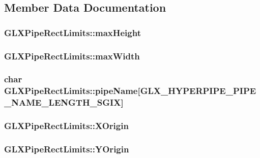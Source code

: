 \subsection{Member Data Documentation}
\hypertarget{struct_g_l_x_pipe_rect_limits_a27572e499c0d3280031c2ad8e387c0c1}{
\subsubsection[{max\-Height}]{ G\-L\-X\-Pipe\-Rect\-Limits\-::max\-Height}}\label{struct_g_l_x_pipe_rect_limits_a27572e499c0d3280031c2ad8e387c0c1}
\hypertarget{struct_g_l_x_pipe_rect_limits_a8662c7a712b30620e25fc994adf337a1}{
\subsubsection[{max\-Width}]{ G\-L\-X\-Pipe\-Rect\-Limits\-::max\-Width}}\label{struct_g_l_x_pipe_rect_limits_a8662c7a712b30620e25fc994adf337a1}
\hypertarget{struct_g_l_x_pipe_rect_limits_ae78b4b6656101bc841946733a5b6e5ce}{
\subsubsection[{pipe\-Name}]{\setlength{\rightskip}{0pt plus 5cm}char G\-L\-X\-Pipe\-Rect\-Limits\-::pipe\-Name\mbox{[}{\bf G\-L\-X\-\_\-\-H\-Y\-P\-E\-R\-P\-I\-P\-E\-\_\-\-P\-I\-P\-E\-\_\-\-N\-A\-M\-E\-\_\-\-L\-E\-N\-G\-T\-H\-\_\-\-S\-G\-I\-X}\mbox{]}}}\label{struct_g_l_x_pipe_rect_limits_ae78b4b6656101bc841946733a5b6e5ce}
\hypertarget{struct_g_l_x_pipe_rect_limits_a3e5a965059d9f5d2ca42acd35af5bb9b}{
\subsubsection[{X\-Origin}]{ G\-L\-X\-Pipe\-Rect\-Limits\-::\-X\-Origin}}\label{struct_g_l_x_pipe_rect_limits_a3e5a965059d9f5d2ca42acd35af5bb9b}
\hypertarget{struct_g_l_x_pipe_rect_limits_a50e06bcf0dae95854be7d93a515199e9}{
\subsubsection[{Y\-Origin}]{ G\-L\-X\-Pipe\-Rect\-Limits\-::\-Y\-Origin}}\label{struct_g_l_x_pipe_rect_limits_a50e06bcf0dae95854be7d93a515199e9}


